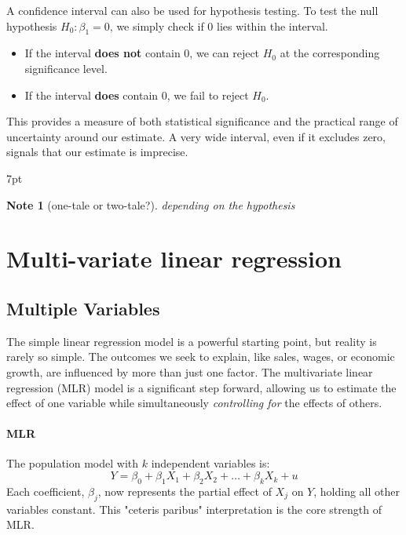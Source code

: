 \documentclass{article}
\providecommand{\tightlist}{
  \setlength{\itemsep}{0pt}
  \setlength{\parskip}{0pt}}
\newenvironment{blueblock}{
\def\FrameCommand{
  \hspace{1pt}
    {\color{DarkBlue}
    \vrule width 2pt}
    {\color{blueshade}
    \vrule width 4pt}
  \colorbox{blueshade}
}
\MakeFramed{
  \advance
  \hsize-
  \width
  \FrameRestore}
\noindent\hspace{-4.55pt}%
\begin{adjustwidth}{}{7pt}
\vspace{2pt}\vspace{2pt}
}
{\vspace{2pt}\end{adjustwidth}\endMakeFramed}
\newtheorem{note}{Note}
\begin{document}
A confidence interval can also be used for hypothesis testing. To test the null hypothesis $H_0: \beta_1=0$, we simply check if 0 lies within the interval.
\begin{itemize}
\tightlist
    \item If the interval \textbf{does not} contain 0, we can reject $H_0$ at the corresponding significance level.
    \item If the interval \textbf{does} contain 0, we fail to reject $H_0$.
\end{itemize}
This provides a measure of both statistical significance and the practical range of uncertainty around our estimate. A very wide interval, even if it excludes zero, signals that our estimate is imprecise.

\begin{blueblock}
\begin{note}[one-tale or two-tale?]
depending on the hypothesis
\end{note}
\end{blueblock}



\section{Multi-variate linear regression} %
\label{sec:multi_variate_linear_regression}

\subsection{Multiple Variables} %
\label{sub:multiple_variables}

The simple linear regression model is a powerful starting point, but reality is rarely so simple. The outcomes we seek to explain, like sales, wages, or economic growth, are influenced by more than just one factor. The multivariate linear regression (MLR) model is a significant step forward, allowing us to estimate the effect of one variable while simultaneously \textit{controlling for} the effects of others.

\paragraph{MLR}
The population model with $k$ independent variables is:
\begin{equation}
Y = \beta_0 + \beta_1 X_1 + \beta_2 X_2 + \dots + \beta_k X_k + u
\end{equation}
Each coefficient, $\beta_j$, now represents the partial effect of $X_j$ on $Y$, holding all other variables constant. This "ceteris paribus" interpretation is the core strength of MLR.
\end{document}
